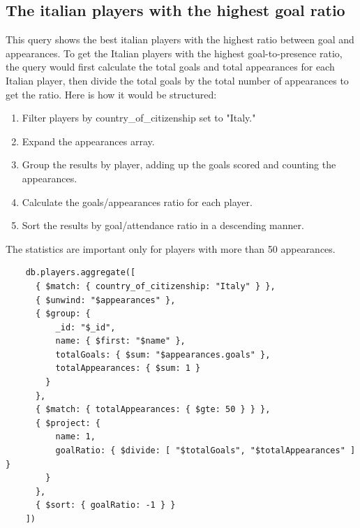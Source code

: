 \documentclass{Configuration_Files/PoliMi3i_thesis}
\begin{document}
\subsection{The italian players with the highest goal ratio}

This query shows the best italian players with the highest ratio between goal and appearances.
To get the Italian players with the highest goal-to-presence ratio, the query would first calculate the total goals and total appearances for each Italian player, then divide the total goals by the total number of appearances to get the ratio. Here is how it would be structured:

\begin{enumerate}
    \item Filter players by country\_of\_citizenship set to "Italy."
    \item Expand the appearances array.
    \item Group the results by player, adding up the goals scored and counting the appearances.
    \item Calculate the goals/appearances ratio for each player.
    \item Sort the results by goal/attendance ratio in a descending manner.
\end{enumerate}
The statistics are important only for players with more than 50 appearances.

\begin{verbatim}
    db.players.aggregate([
      { $match: { country_of_citizenship: "Italy" } },
      { $unwind: "$appearances" },
      { $group: { 
          _id: "$_id", 
          name: { $first: "$name" }, 
          totalGoals: { $sum: "$appearances.goals" }, 
          totalAppearances: { $sum: 1 }
        } 
      },
      { $match: { totalAppearances: { $gte: 50 } } },
      { $project: { 
          name: 1, 
          goalRatio: { $divide: [ "$totalGoals", "$totalAppearances" ] }
        } 
      },
      { $sort: { goalRatio: -1 } }
    ])
\end{verbatim}
\end{document}
